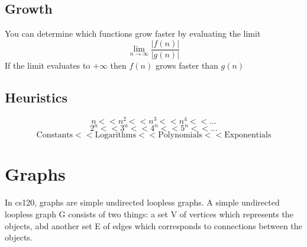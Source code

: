 \documentclass[12pt] {article}
\begin{document}
\subsection*{Growth}
You can determine which functions grow faster by evaluating the limit 
\begin{equation*}
  \lim_{n\to\infty} \frac{|f(n)|}{|g(n)|}
\end{equation*}
If the limit evaluates to $+\infty$ then $f(n)$ grows faster than $g(n)$

\subsection*{Heuristics}
\begin{equation*}
  n<<n^2<<n^3<<n^4<<\dotsc
\end{equation*}
\begin{equation*}
  2^n<<3^n<<4^n<<5^n<<\dotsc
\end{equation*}
\begin{equation*}
  \text{Constants}<<\text{Logarithms}<<\text{Polynomials}<<\text{Exponentials}
\end{equation*}


\section*{Graphs}
In cs120, graphs are simple undirected loopless graphs. A simple undirected loopless graph G 
consists of two things: a set V of vertices which represents the objects, abd 
another set E of edges which corresponds to connections between the objects. 
\end{document}

